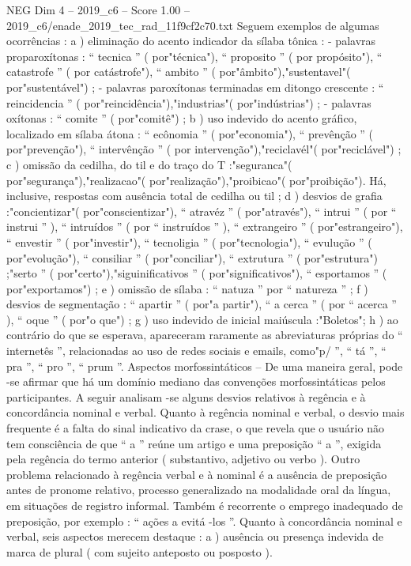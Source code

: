 \begin{textsample}{NEG Dim 4 – 2019\_c6 – Score 1.00 – 2019\_c6/enade\_2019\_tec\_rad\_11f9cf2c70.txt}
Seguem exemplos de algumas ocorrências : a ) eliminação do acento indicador da sílaba tônica : - palavras proparoxítonas : “ tecnica ” ( por"técnica"), “ proposito ” ( por propósito"), “ catastrofe ” ( por catástrofe"), “ ambito ” ( por"âmbito"),"sustentavel"( por"sustentável") ; - palavras paroxítonas terminadas em ditongo crescente : “ reincidencia ” ( por"reincidência"),"industrias"( por"indústrias") ; - palavras oxítonas : “ comite ” ( por"comitê") ; b ) uso indevido do acento gráfico, localizado em sílaba átona : “ ecônomia ” ( por"economia"), “ prevênção ” ( por"prevenção"), “ intervênção ” ( por intervenção"),"reciclavél"( por"reciclável") ; c ) omissão da cedilha, do til e do traço do T :"seguranca"( por"segurança"),"realizacao"( por"realização"),"proibicao"( por"proibição").
Há, inclusive, respostas com ausência total de cedilha ou til ; d ) desvios de grafia :"concientizar"( por"conscientizar"), “ atravéz ” ( por"através"), “ intrui ” ( por “ instrui ” ), “ intruídos ” ( por “ instruídos ” ), “ extrangeiro ” ( por"estrangeiro"), “ envestir ” ( por"investir"), “ tecnoligia ” ( por"tecnologia"), “ evulução ” ( por"evolução"), “ consiliar ” ( por"conciliar"), “ extrutura ” ( por"estrutura") ;"serto ” ( por"certo"),"siguinificativos ” ( por"significativos"), “ esportamos ” ( por"exportamos") ; e ) omissão de sílaba : “ natuza ” por “ natureza ” ; f ) desvios de segmentação : “ apartir ” ( por"a partir"), “ a cerca ” ( por “ acerca ” ), “ oque ” ( por"o que") ; g ) uso indevido de inicial maiúscula :"Boletos"; h ) ao contrário do que se esperava, apareceram raramente as abreviaturas próprias do “ internetês ”, relacionadas ao uso de redes sociais e emails, como"p/ ”, “ tá ”, “ pra ”, “ pro ”, “ prum ”.
Aspectos morfossintáticos – De uma maneira geral, pode -se afirmar que há um domínio mediano das convenções morfossintáticas pelos participantes.
A seguir analisam -se alguns desvios relativos à regência e à concordância nominal e verbal.
Quanto à regência nominal e verbal, o desvio mais frequente é a falta do sinal indicativo da crase, o que revela que o usuário não tem consciência de que “ a ” reúne um artigo e uma preposição “ a ”, exigida pela regência do termo anterior ( substantivo, adjetivo ou verbo ).
Outro problema relacionado à regência verbal e à nominal é a ausência de preposição antes de pronome relativo, processo generalizado na modalidade oral da língua, em situações de registro informal.
Também é recorrente o emprego inadequado de preposição, por exemplo : “ ações a evitá -los ”.
Quanto à concordância nominal e verbal, seis aspectos merecem destaque : a ) ausência ou presença indevida de marca de plural ( com sujeito anteposto ou posposto ).

\end{textsample}
